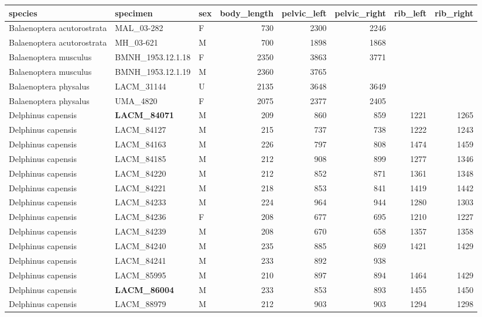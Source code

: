\begin{table}[ht]
\centering
\begin{tabular}{lllrrrrr}
  \hline
species & specimen & sex & body\_length & pelvic\_left & pelvic\_right & rib\_left & rib\_right \\ 
  \hline
Balaenoptera acutorostrata & MAL\_03-282 & F & 730 & 2300 & 2246 &  &  \\ 
  Balaenoptera acutorostrata & MH\_03-621 & M & 700 & 1898 & 1868 &  &  \\ 
  Balaenoptera musculus & BMNH\_1953.12.1.18 & F & 2350 & 3863 & 3771 &  &  \\ 
  Balaenoptera musculus & BMNH\_1953.12.1.19 & M & 2360 & 3765 &  &  &  \\ 
  Balaenoptera physalus & LACM\_31144 & U & 2135 & 3648 & 3649 &  &  \\ 
  Balaenoptera physalus & UMA\_4820 & F & 2075 & 2377 & 2405 &  &  \\ 
  Delphinus capensis & \textbf{ LACM\_84071 } & M & 209 & 860 & 859 & 1221 & 1265 \\ 
  Delphinus capensis & LACM\_84127 & M & 215 & 737 & 738 & 1222 & 1243 \\ 
  Delphinus capensis & LACM\_84163 & M & 226 & 797 & 808 & 1474 & 1459 \\ 
  Delphinus capensis & LACM\_84185 & M & 212 & 908 & 899 & 1277 & 1346 \\ 
  Delphinus capensis & LACM\_84220 & M & 212 & 852 & 871 & 1361 & 1348 \\ 
  Delphinus capensis & LACM\_84221 & M & 218 & 853 & 841 & 1419 & 1442 \\ 
  Delphinus capensis & LACM\_84233 & M & 224 & 964 & 944 & 1280 & 1303 \\ 
  Delphinus capensis & LACM\_84236 & F & 208 & 677 & 695 & 1210 & 1227 \\ 
  Delphinus capensis & LACM\_84239 & M & 208 & 670 & 658 & 1357 & 1358 \\ 
  Delphinus capensis & LACM\_84240 & M & 235 & 885 & 869 & 1421 & 1429 \\ 
  Delphinus capensis & LACM\_84241 & M & 233 & 892 & 938 &  &  \\ 
  Delphinus capensis & LACM\_85995 & M & 210 & 897 & 894 & 1464 & 1429 \\ 
  Delphinus capensis & \textbf{ LACM\_86004 } & M & 233 & 853 & 893 & 1455 & 1450 \\ 
  Delphinus capensis & LACM\_88979 & M & 212 & 903 & 903 & 1294 & 1298 \\ 

\end{tabular}
\end{table}
